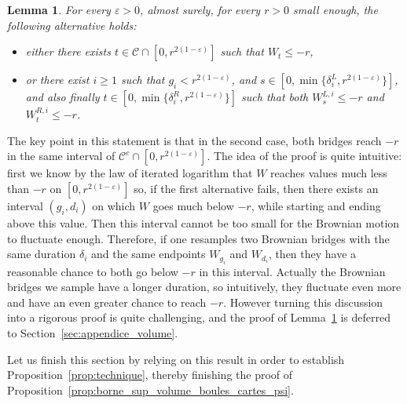 \documentclass[british, a4paper,11pt]{article}
\numberwithin{equation}{section}
\newtheorem{lem}[thm]{Lemma}
\theoremstyle{definition}
\begin{document}
\begin{lem}\label{lem:technique}
For every $\varepsilon > 0$, almost surely, for every $r>0$ small enough, the following alternative holds: 
\begin{itemize}
\item either there exists $t \in \mathcal{C} \cap [0, r^{2(1-\varepsilon)}]$ such that $W_t \leq -r$,
\item or there exist $i \geq 1$ such that $g_i < r^{2(1-\varepsilon)}$, and $s \in [0, \min\{\delta^L_i, r^{2(1-\varepsilon)}\}]$, and also finally $t \in [0, \min\{\delta^R_i, r^{2(1-\varepsilon)}\}]$ such that both $W^{L,i}_s \leq -r$ and $W^{R,i}_t \leq -r$.
\end{itemize}
\end{lem}



The key point in this statement is that in the second case, both bridges reach $-r$ in the same interval of $\mathcal{C}^c \cap [0, r^{2(1-\varepsilon)}]$.
The idea of the proof is quite intuitive: first we know by the law of iterated logarithm that $W$ reaches values much less than $-r$ on $[0, r^{2(1-\varepsilon)}]$ so, if the first alternative fails, then there exists an interval $(g_i, d_i)$ on which $W$ goes much below $-r$, while starting and ending above this value. Then this interval cannot be too small for the Brownian motion to fluctuate enough. Therefore, if one resamples two Brownian bridges with the same duration $\delta_i$ and the same endpoints $W_{g_i}$ and $W_{d_i}$, then they have a reasonable chance to both go below $-r$ in this interval. Actually the Brownian bridges we sample have a longer duration, so intuitively, they fluctuate even more and have an even greater chance to reach $-r$.
However turning this discussion into a rigorous proof is quite challenging, and the proof of Lemma~\ref{lem:technique} is deferred to Section~\ref{sec:appendice_volume}.

Let us finish this section by relying on this result in order to establish Proposition~\ref{prop:technique}, thereby finishing the proof of Proposition~\ref{prop:borne_sup_volume_boules_cartes_psi}.
\end{document}
